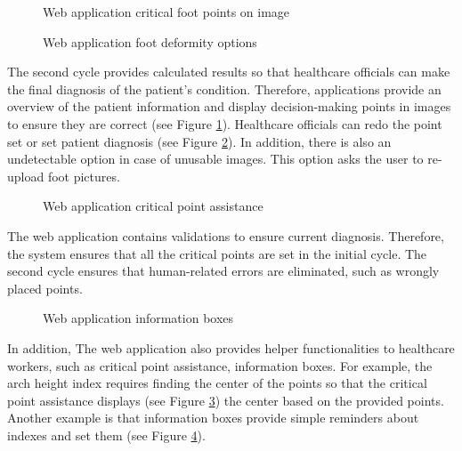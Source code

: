 \begin{figure}[htbp]
\centering
{}
\caption{Web application critical foot points on image}
\label{fig:WebApplicationFootPoints}
\end{figure}

\begin{figure}[htbp]
\centering
{}
\caption{Web application foot deformity options}
\label{fig:WebApplicationSetFootDeformity}
\end{figure}

The second cycle provides calculated results so that healthcare officials can make the final diagnosis of the patient's condition. Therefore, applications provide an overview of the patient information and display decision-making points in images to ensure they are correct (see Figure \ref{fig:WebApplicationFootPoints}). Healthcare officials can redo the point set or set patient diagnosis (see Figure \ref{fig:WebApplicationSetFootDeformity}). In addition, there is also an undetectable option in case of unusable images. This option asks the user to re-upload foot pictures.

\begin{figure}[htbp]
\centering
{}
\caption{Web application critical point assistance}
\label{fig:WebApplicationCriticalPointAssistance}
\end{figure}

The web application contains validations to ensure current diagnosis. Therefore, the system ensures that all the critical points are set in the initial cycle. The second cycle ensures that human-related errors are eliminated, such as wrongly placed points. 

\begin{figure}[htbp]
\centering
{}
\caption{Web application information boxes}
\label{fig:WebApplicationInformationBoxes}
\end{figure}

In addition, The web application also provides helper functionalities to healthcare workers, such as critical point assistance, information boxes. For example, the arch height index requires finding the center of the points so that the critical point assistance displays (see Figure \ref{fig:WebApplicationCriticalPointAssistance}) the center based on the provided points. Another example is that information boxes provide simple reminders about indexes and set them (see Figure \ref{fig:WebApplicationInformationBoxes}).

